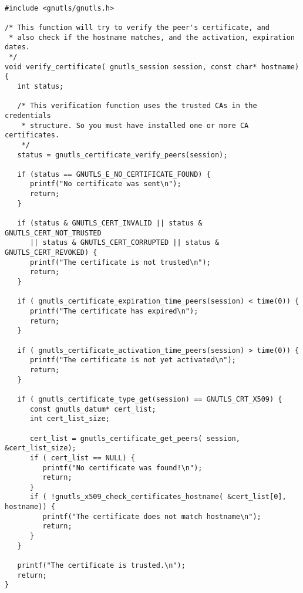 \label{ex:rfc2818}

\begin{verbatim}

#include <gnutls/gnutls.h>

/* This function will try to verify the peer's certificate, and
 * also check if the hostname matches, and the activation, expiration dates.
 */
void verify_certificate( gnutls_session session, const char* hostname)
{
   int status;

   /* This verification function uses the trusted CAs in the credentials
    * structure. So you must have installed one or more CA certificates.
    */
   status = gnutls_certificate_verify_peers(session);

   if (status == GNUTLS_E_NO_CERTIFICATE_FOUND) {
      printf("No certificate was sent\n");
      return;
   }

   if (status & GNUTLS_CERT_INVALID || status & GNUTLS_CERT_NOT_TRUSTED
      || status & GNUTLS_CERT_CORRUPTED || status & GNUTLS_CERT_REVOKED) {
      printf("The certificate is not trusted\n");
      return;
   }

   if ( gnutls_certificate_expiration_time_peers(session) < time(0)) {
      printf("The certificate has expired\n");
      return;
   }

   if ( gnutls_certificate_activation_time_peers(session) > time(0)) {
      printf("The certificate is not yet activated\n");
      return;
   }

   if ( gnutls_certificate_type_get(session) == GNUTLS_CRT_X509) {
      const gnutls_datum* cert_list;
      int cert_list_size;
      
      cert_list = gnutls_certificate_get_peers( session, &cert_list_size);
      if ( cert_list == NULL) {
         printf("No certificate was found!\n");
         return;
      }
      if ( !gnutls_x509_check_certificates_hostname( &cert_list[0], hostname)) {
         printf("The certificate does not match hostname\n");
         return;
      }
   }
   
   printf("The certificate is trusted.\n");
   return;
}

\end{verbatim}
